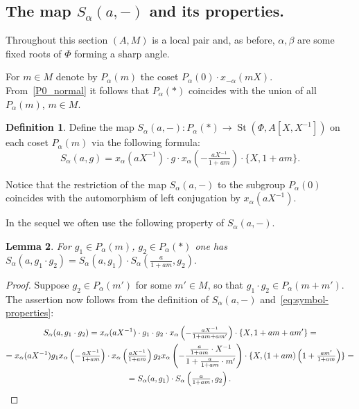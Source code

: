 \documentclass[oneside, 8pt]{amsart}
\newtheorem{lemma}{Lemma}
\theoremstyle{remark}
\theoremstyle{definition}
\numberwithin{lemma}{section}
\numberwithin{prop}{section}
\numberwithin{corollary}{section}
\numberwithin{externaltheorem}{section}
\newtheorem{df}[lemma]{Definition} \Crefname{df}{Definition}{Definitions}
\DeclareMathOperator{\St}{St}
\numberwithin{equation}{section}
\begin{document}
\subsection{The map \texorpdfstring{$S_\alpha(a, -)$}{S(a,-)} and its properties.} \label{sec:S-a}
Throughout this section $(A, M)$ is a local pair and, as before, $\alpha, \beta$ are some fixed roots of $\Phi$ forming a sharp angle.

For $m \in M$ denote by $P_\alpha(m)$ the coset $P_\alpha(0) \cdot x_{-\alpha}(mX)$.
From~\cref{P0_normal} it follows that $P_\alpha(*)$ coincides with the union of all $P_\alpha(m)$, $m\in M$. 
\begin{df}\label{S-def}
Define the map $S_\alpha(a, -) \colon P_\alpha(*) \to \St(\Phi, A[X, X^{-1}])$ on each coset $P_\alpha(m)$ via the following formula:
\begin{equation}\label{eq:S-def} S_\alpha(a, g) = x_\alpha(aX^{-1})\cdot g \cdot x_\alpha\left(-\tfrac{aX^{-1}}{1 + am}\right) \cdot \{X, 1+ am\}.\end{equation} \end{df}
Notice that the restriction of the map $S_\alpha(a, -)$ to the subgroup $P_\alpha(0)$ coincides with the automorphism of left conjugation by $x_\alpha(aX^{-1})$.

In the sequel we often use the following property of $S_\alpha(a, -)$.
\begin{lemma} \label{lem:Smult}
For $g_1 \in P_\alpha(m)$, $g_2 \in P_\alpha(*)$ one has
$S_\alpha(a, g_1\cdot g_2) = S_\alpha(a, g_1) \cdot S_\alpha\left(\tfrac{a}{1+am}, g_2\right).$
\end{lemma} \begin{proof} Suppose $g_2\in P_\alpha(m')$ for some $m' \in M$, so that $g_1 \cdot g_2 \in P_\alpha(m + m')$. The assertion now follows from the definition of $S_\alpha(a, -)$ and~\eqref{eq:symbol-properties}:
\begin{multline*} S_\alpha(a, g_1 \cdot g_2) = x_\alpha(aX^{-1}) \cdot g_1 \cdot g_2 \cdot x_\alpha\left(-\tfrac{aX^{-1}}{1+am+am'}\right) \cdot \{X, 1 + am + am'\} = \\ = x_\alpha(aX^{-1}) g_1  x_\alpha\left(-\tfrac{aX^{-1}}{1+am}\right) \cdot x_\alpha\left(\tfrac{aX^{-1}}{1+am}\right) g_2 x_\alpha\left(-\frac{\tfrac{a}{1+am}\cdot X^{-1}}{1 + \tfrac{a}{1+am}\cdot m'}\right) \cdot \{X, (1+am)\left(1 + \tfrac{am'}{1+am}\right)\} = \\ = S_\alpha(a, g_1) \cdot S_\alpha\left(\tfrac{a}{1+am}, g_2\right). \qedhere \end{multline*}
\end{proof}
\end{document}
